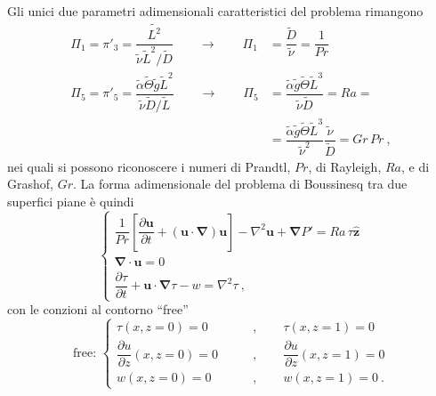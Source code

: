\documentclass{article}
\begin{document}
Gli unici due parametri adimensionali caratteristici del problema rimangono
\begin{equation}
\begin{aligned}
 \Pi_1 = \pi'_3 = \dfrac{\tilde{L^2}}{\tilde{\nu} \tilde{L}^2/\tilde{D}} \qquad \rightarrow \qquad \Pi_1  & = \dfrac{\tilde{D}}{\tilde{\nu}} = \dfrac{1}{Pr} \\
 \Pi_5 = \pi'_5 = \dfrac{\tilde{\alpha}\tilde{\Theta} \tilde{g} \tilde{L}^2}{\tilde{\nu} \tilde{D}/\tilde{L}} \qquad \rightarrow \qquad \Pi_5 & = \dfrac{\tilde{\alpha}\tilde{g}\tilde{\Theta}  \tilde{L}^3}{\tilde{\nu} \tilde{D}} = Ra = \\
 & = \dfrac{\tilde{\alpha}\tilde{g}\tilde{\Theta}  \tilde{L}^3}{\tilde{\nu}^2}\dfrac{\tilde{\nu}}{\tilde{D}} = Gr \, Pr \ ,
\end{aligned}
\end{equation}
nei quali si possono riconoscere i numeri di Prandtl, $Pr$, di Rayleigh, $Ra$, e di Grashof, $Gr$.
%
\newline
La forma adimensionale del problema di Boussinesq tra due superfici piane è quindi
\begin{equation}\label{eqn:Bouss-tau-adim-3}
    \begin{cases}
      \dfrac{1}{Pr} \left[ \dfrac{\partial \bm{u}}{\partial t} +
      \left( \bm{u} \cdot \bm{\nabla} \right) \bm{u} \right] -
      \nabla^2 \bm{u} + \bm{\nabla} P' = Ra \, \tau \bm{\hat{z}} \\
      \bm{\nabla} \cdot \bm{u} = 0 \\
      \dfrac{\partial \tau}{\partial t} + \bm{u} \cdot 
      \bm{\nabla} \tau -  w = \nabla^{2} \tau \ ,
    \end{cases}
\end{equation}
con le conzioni al contorno ``free''
\begin{equation}\label{eqn:Bouss-adim-3-bc}
    \text{free: }
    \left\{
    \begin{aligned}
      \tau(x,z=0) = 0 \qquad  & , \qquad 
      \tau(x,z=1) = 0 \\
      \dfrac{\partial u}{\partial z}(x,z=0) = 0 \qquad & , \qquad 
      \dfrac{\partial u}{\partial z}(x,z=1) = 0 \\
      w(x,z=0) = 0 \qquad & , \qquad w(x,z=1) = 0 \ .
    \end{aligned} \right.
\end{equation}
\end{document}
